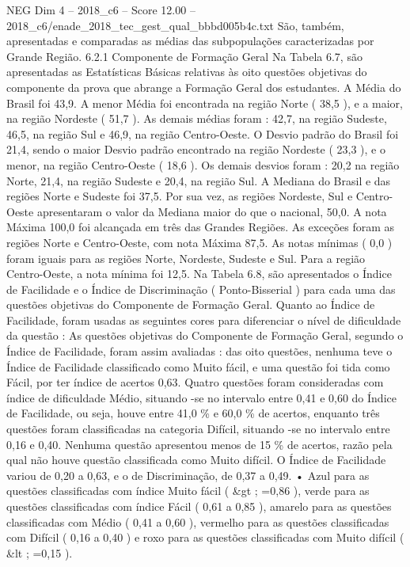 \begin{textsample}{NEG Dim 4 – 2018\_c6 – Score 12.00 – 2018\_c6/enade\_2018\_tec\_gest\_qual\_bbbd005b4c.txt}
São, também, apresentadas e comparadas as médias das subpopulações caracterizadas por Grande Região. 6.2.1 Componente de Formação Geral Na Tabela 6.7, são apresentadas as Estatísticas Básicas relativas às oito questões objetivas do componente da prova que abrange a Formação Geral dos estudantes.
A Média do Brasil foi 43,9.
A menor Média foi encontrada na região Norte ( 38,5 ), e a maior, na região Nordeste ( 51,7 ).
As demais médias foram : 42,7, na região Sudeste, 46,5, na região Sul e 46,9, na região Centro-Oeste.
O Desvio padrão do Brasil foi 21,4, sendo o maior Desvio padrão encontrado na região Nordeste ( 23,3 ), e o menor, na região Centro-Oeste ( 18,6 ).
Os demais desvios foram : 20,2 na região Norte, 21,4, na região Sudeste e 20,4, na região Sul.
A Mediana do Brasil e das regiões Norte e Sudeste foi 37,5.
Por sua vez, as regiões Nordeste, Sul e Centro-Oeste apresentaram o valor da Mediana maior do que o nacional, 50,0.
A nota Máxima 100,0 foi alcançada em três das Grandes Regiões.
As exceções foram as regiões Norte e Centro-Oeste, com nota Máxima 87,5.
As notas mínimas ( 0,0 ) foram iguais para as regiões Norte, Nordeste, Sudeste e Sul.
Para a região Centro-Oeste, a nota mínima foi 12,5.
Na Tabela 6.8, são apresentados o Índice de Facilidade e o Índice de Discriminação ( Ponto-Bisserial ) para cada uma das questões objetivas do Componente de Formação Geral.
Quanto ao Índice de Facilidade, foram usadas as seguintes cores para diferenciar o nível de dificuldade da questão : As questões objetivas do Componente de Formação Geral, segundo o Índice de Facilidade, foram assim avaliadas : das oito questões, nenhuma teve o Índice de Facilidade classificado como Muito fácil, e uma questão foi tida como Fácil, por ter índice de acertos 0,63.
Quatro questões foram consideradas com índice de dificuldade Médio, situando -se no intervalo entre 0,41 e 0,60 do Índice de Facilidade, ou seja, houve entre 41,0 \% e 60,0 \% de acertos, enquanto três questões foram classificadas na categoria Difícil, situando -se no intervalo entre 0,16 e 0,40.
Nenhuma questão apresentou menos de 15 \% de acertos, razão pela qual não houve questão classificada como Muito difícil.
O Índice de Facilidade variou de 0,20 a 0,63, e o de Discriminação, de 0,37 a 0,49. • Azul para as questões classificadas com índice Muito fácil ( \&gt ; =0,86 ), verde para as questões classificadas com índice Fácil ( 0,61 a 0,85 ), amarelo para as questões classificadas com Médio ( 0,41 a 0,60 ), vermelho para as questões classificadas com Difícil ( 0,16 a 0,40 ) e roxo para as questões classificadas com Muito difícil ( \&lt ; =0,15 ).

\end{textsample}
